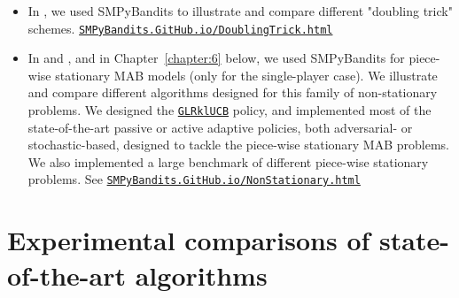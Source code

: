 \begin{itemize}
    \item
In \cite{Besson2018DoublingTricks}, we used SMPyBandits to illustrate and compare different "doubling trick" schemes.
\texttt{\href{https://SMPyBandits.GitHub.io/DoublingTrick.html}{SMPyBandits.GitHub.io/DoublingTrick.html}}

    \item
In \cite{Besson2019GLRT} and \cite{Besson2019Gretsi}, and in Chapter~\ref{chapter:6} below, we used SMPyBandits for piece-wise stationary MAB models (only for the single-player case). We illustrate and compare different algorithms designed for this family of non-stationary problems.
We designed the \texttt{\href{https://SMPyBandits.GitHub.io/docs/Policies.GLR_UCB.html}{GLRklUCB}} policy, and implemented most of the state-of-the-art passive or active adaptive policies, both adversarial- or stochastic-based, designed to tackle the piece-wise stationary MAB problems.
We also implemented a large benchmark of different piece-wise stationary problems.
See \texttt{\href{https://SMPyBandits.GitHub.io/NonStationary.html}{SMPyBandits.GitHub.io/NonStationary.html}}
\end{itemize}


\section{Experimental comparisons of state-of-the-art algorithms}
\label{sec:3:reviewSPAlgorithms}

